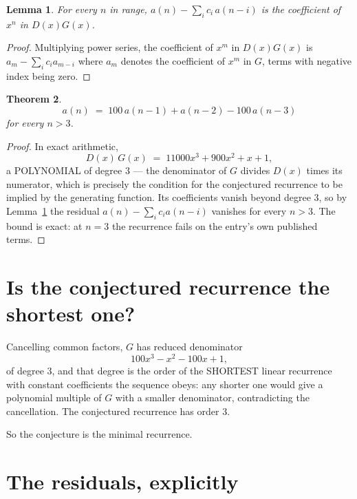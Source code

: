 \documentclass[11pt,a4paper]{article}
\theoremstyle{plain}
\newtheorem{theorem}{Theorem}
\newtheorem{lemma}[theorem]{Lemma}
\theoremstyle{definition}
\begin{document}
\begin{lemma}\label{lem:key}
For every $n$ in range, $a(n)-\sum_i c_i\,a(n-i)$ is the coefficient of $x^{n}$ in
$D(x)G(x)$.
\end{lemma}

\begin{proof}
Multiplying power series, the coefficient of $x^{m}$ in $D(x)G(x)$ is
$a_m-\sum_i c_i a_{m-i}$ where $a_m$ denotes the coefficient of $x^{m}$ in $G$, terms with
negative index being zero.
\end{proof}

\begin{theorem}
\[
a(n)\;=\;100\,a(n-1) + a(n-2) - 100\,a(n-3)
\]
for every $n>3$.
\end{theorem}

\begin{proof}
In exact arithmetic,
\[
D(x)\,G(x)\;=\;11000 x^{3} + 900 x^{2} + x + 1,
\]
a POLYNOMIAL of degree $3$ --- the denominator of $G$ divides $D(x)$ times its numerator,
which is precisely the condition for the conjectured recurrence to be implied by the
generating function. Its coefficients vanish beyond degree $3$, so by
Lemma~\ref{lem:key} the residual $a(n)-\sum_ic_ia(n-i)$ vanishes for every
$n>3$. The bound is exact: at $n=3$ the recurrence fails on the entry's own published terms.
\end{proof}

\section{Is the conjectured recurrence the shortest one?}

Cancelling common factors, $G$ has reduced denominator
\[
100 x^{3} - x^{2} - 100 x + 1,
\]
of degree $3$, and that degree is the order of the SHORTEST linear recurrence with
constant coefficients the sequence obeys: any shorter one would give a polynomial multiple of
$G$ with a smaller denominator, contradicting the cancellation. The conjectured recurrence has
order $3$.

So the conjecture is the minimal recurrence.

\section{The residuals, explicitly}
\end{document}
